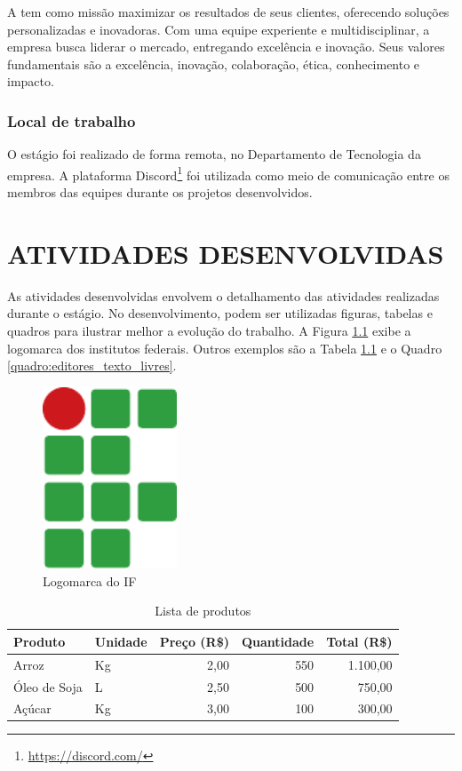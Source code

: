 \documentclass[estagio]{iftex2024}
\begin{document}
A {\theEmpresa} tem como missão maximizar os resultados de seus clientes, oferecendo soluções personalizadas e inovadoras.
Com uma equipe experiente e multidisciplinar, a empresa busca liderar o mercado, entregando excelência e inovação.
Seus valores fundamentais são a excelência, inovação, colaboração, ética, conhecimento e impacto.

\subsection{Local de trabalho}

O estágio foi realizado de forma remota, no Departamento de Tecnologia da empresa.
A plataforma Discord\footnote{\url{https://discord.com/}} foi utilizada como meio de comunicação entre os membros das equipes durante os projetos desenvolvidos.

\chapter{ATIVIDADES DESENVOLVIDAS}

As atividades desenvolvidas envolvem o detalhamento das atividades realizadas durante o estágio.
No desenvolvimento, podem ser utilizadas figuras, tabelas e quadros para ilustrar melhor a evolução do trabalho.
A Figura \ref{figura:logomarca_if} exibe a logomarca dos institutos federais.
Outros exemplos são a Tabela \ref{tabela:lista_produtos} e o Quadro \ref{quadro:editores_texto_livres}.

\begin{figure}[!htb] \centering
  \caption{Logomarca do IF} \label{figura:logomarca_if}
  \begin{varwidth}{\linewidth}
    \includegraphics[width=4cm]{figuras/if}
  \end{varwidth}
\end{figure}

\begin{table}[!htb]
\caption{Lista de produtos} \label{tabela:lista_produtos}
\begin{tabularx}{\textwidth}{X|l|r|r|r} \hline
Produto      & Unidade & Preço (R\$) & Quantidade & Total (R\$) \\ \hline
Arroz        & Kg      & 2,00        & 550        & 1.100,00    \\
Óleo de Soja & L       & 2,50        & 500        & 750,00      \\
Açúcar       & Kg      & 3,00        & 100        & 300,00      \\ \hline
\end{tabularx}
\end{table}
\end{document}
